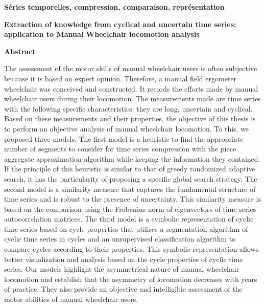 \hrulefill%
{\Large \textbf{Séries temporelles, compression, comparaison, représentation }}
\hrulefill%


\newpage

{\Large \textbf{    Extraction of knowledge from cyclical and uncertain time series: application to Manual Wheelchair locomotion analysis}}
{\large \textbf{}}
\hrulefill%
\begin{center}
{\Large \textbf{Abstract}}
\end{center}

The assessment of the motor skills of manual wheelchair users is often subjective because it is based on expert opinion. Therefore, a manual field ergometer wheelchair was conceived and constructed. It records the efforts made by manual wheelchair users during their locomotion. The measurements made are time series with the following specific characteristics: they are long, uncertain and cyclical. Based on these measurements and their properties, the objective of this thesis is to perform an objective analysis of manual wheelchair locomotion. To this, we proposed three models. The first model is a heuristic to find the appropriate number of segments to consider for time series compression with the piece aggregate approximation algorithm while keeping the information they contained. If the principle of this heuristic is similar to that of greedy randomized adaptive search, it has the particularity of proposing a specific global search strategy. The second model is a similarity measure that captures the fundamental structure of time series and is robust to the presence of uncertainty. This similarity measure is based on the comparison using the Frobenius norm of eigenvectors of time series autocorrelation matrices. The third model is a symbolic representation of cyclic time series based on cycle properties that utilises a segmentation algorithm of cyclic time series  in cycles and an unsupervised classification algorithm to compare cycles according to their properties. This symbolic representation allows better visualization and analysis based on the cycle properties of cyclic time series. Our models highlight the asymmetrical nature of manual wheelchair locomotion and establish that the asymmetry of locomotion decreases with years of practice. They also provide an objective and intelligible assessment of the motor abilities of manual wheelchair users.

